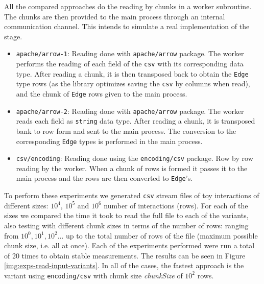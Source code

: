 All the compared approaches do the reading by chunks in a worker subroutine. The chunks are then provided to the main process through an internal communication channel. This intends to simulate a real implementation of the \source \Sr stage.

\begin{itemize}
  \item \texttt{apache/arrow-1}: Reading done with \texttt{apache/arrow} package. The worker performs the reading of each field of the \texttt{csv} with its corresponding data type. After reading a chunk, it is then transposed back to obtain the \texttt{Edge} type rows (as the library optimizes saving the \texttt{csv} by columns when read), and the chunk of \texttt{Edge} rows given to the main process. 
  \item \texttt{apache/arrow-2}: Reading done with \texttt{apache/arrow} package. The worker reads each field as \texttt{string} data type. After reading a chunk, it is transposed bank to row form and sent to the main process. The conversion to the corresponding \texttt{Edge} types is performed in the main process.
  \item \texttt{csv/encoding}: Reading done using the \texttt{encoding/csv} package. Row by row reading by the worker. When a chunk of rows is formed it passes it to the main process and the rows are then converted to \texttt{Edge}'s.
\end{itemize}

To perform these experiments we generated \texttt{csv} stream files of toy interactions of different sizes: $10^4$, $10^5$ and $10^6$ number of interactions (rows). For each of the sizes we compared the time it took to read the full file to each of the variants, also testing with different chunk sizes in terms of the number of rows: ranging from $10^0, 10^1, 10^2...$ up to the total number of rows of the file (maximum possible chunk size, i.e. all at once). Each of the experiments performed were run a total of 20 times to obtain stable measurements. The results can be seen in Figure \ref{img:exps-read-input-variants}. In all of the cases, the fastest approach is the variant using \texttt{encoding/csv} with chunk size \emph{chunkSize} of $10^2$ rows.\\

